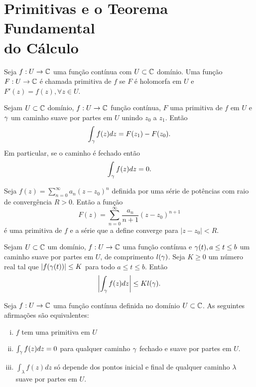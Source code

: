 \section[Primitivas e o Teorema Fundamental do Cálculo]
{Primitivas e o Teorema Fundamental\\ do Cálculo}

\begin{definicao}
\label{def:primitiva-complexa}
Seja $f:U \to \mathbb{C}$ uma função contínua com $U\subset\mathbb{C}$ domínio. Uma função $F:U\to\mathbb{C}$
é chamada primitiva de $f$ se $F$ é holomorfa em $U$ e $F'(z) = f(z), \forall z\in U$.
\end{definicao}

\begin{teorema}

Sejam $U\subset\mathbb{C}$ domínio, $f:U\to\mathbb{C}$ função contínua,
$F$ uma primitiva de $f$ em $U$ e $\gamma$ um caminho suave por partes em $U$ unindo $z_0$ a $z_1$. Então
\begin{equation*}
    \int_{\gamma} f(z)dz = F(z_1) - F(z_0).
\end{equation*}
Em particular, se o caminho é fechado então
\begin{equation*}
    \int_{\gamma} f(z)dz = 0.
\end{equation*}
\end{teorema}

\begin{proposicao}
Seja $\displaystyle{ f(z) = \sum_{n=0}^{\infty} a_n(z-z_0)^n }$
definida por uma série de potências com raio de convergência $R>0$.
Então a função
\begin{equation*}
    F(z) = \sum_{n=0}^{\infty} \frac{a_n}{n+1}(z-z_0)^{n+1}
\end{equation*}
é uma primitiva de $f$ e a série que a define converge para $|z-z_0| < R$.
\end{proposicao}

\begin{lema}
\label{lema-tecnico}
Sejam $U\subset\mathbb{C}$ um domínio, $f:U\to\mathbb{C}$ uma função contínua e
$\gamma(t), a\leq t\leq b$ um caminho suave por partes em $U$, de comprimento $l(\gamma)$.
Seja $K\geq 0$ um número real tal que $|f(\gamma(t))| \leq K$ para todo $a\leq t\leq b$. Então
\begin{equation*}
    \left| \int_{\gamma}f(z)dz \right| \leq Kl(\gamma).
\end{equation*}
\end{lema}

\begin{teorema}
Seja $f:U\to \mathbb{C}$ uma função contínua definida no domínio $U\subset\mathbb{C}$. As seguintes afirmações são equivalentes:
\begin{enumerate}[(i)]
    \item $f$ tem uma primitiva em $U$
    \item $\int_{\gamma} f(z) dz = 0$ para qualquer caminho $\gamma$ fechado e suave por partes em $U$.
    \item $\int_{\lambda} f(z) dz$ só depende dos pontos inicial e final de qualquer caminho $\lambda$ suave por partes em $U$.
\end{enumerate}
\end{teorema}


